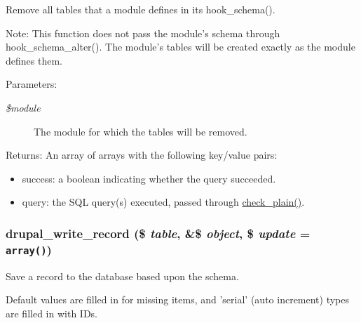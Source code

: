 Remove all tables that a module defines in its hook\_\-schema().

Note: This function does not pass the module's schema through hook\_\-schema\_\-alter(). The module's tables will be created exactly as the module defines them.

\begin{Desc}
\item[Parameters:]
\begin{description}
\item[{\em \$module}]The module for which the tables will be removed. \end{description}
\end{Desc}
\begin{Desc}
\item[Returns:]An array of arrays with the following key/value pairs:\begin{itemize}
\item success: a boolean indicating whether the query succeeded.\item query: the SQL query(s) executed, passed through \hyperlink{bootstrap_8inc_76fc67a30fd8d75ddd80565e6e65a13d}{check\_\-plain()}. \end{itemize}
\end{Desc}
\hypertarget{group__schemaapi_g85da8424c4111b46aefb6fcb3a899c7d}{
\subsubsection[{drupal\_\-write\_\-record}]{\setlength{\rightskip}{0pt plus 5cm}drupal\_\-write\_\-record (\$ {\em table}, \/  \&\$ {\em object}, \/  \$ {\em update} = {\tt array()})}}
\label{group__schemaapi_g85da8424c4111b46aefb6fcb3a899c7d}


Save a record to the database based upon the schema.

Default values are filled in for missing items, and 'serial' (auto increment) types are filled in with IDs.

